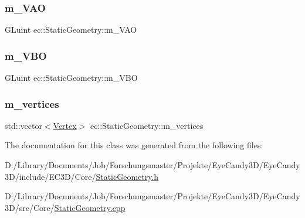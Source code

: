 \mbox{\label{classec_1_1_static_geometry_a7334854b00afa43e3ce02ce2e0600631}} 
\subsubsection{\texorpdfstring{m\+\_\+\+V\+AO}{m\_VAO}}
{\footnotesize\ttfamily G\+Luint ec\+::\+Static\+Geometry\+::m\+\_\+\+V\+AO\hspace{0.3cm}{\ttfamily [protected]}}

\mbox{\label{classec_1_1_static_geometry_a14a581a93ea66ca97c79d554390fbd7b}} 
\subsubsection{\texorpdfstring{m\+\_\+\+V\+BO}{m\_VBO}}
{\footnotesize\ttfamily G\+Luint ec\+::\+Static\+Geometry\+::m\+\_\+\+V\+BO\hspace{0.3cm}{\ttfamily [protected]}}

\mbox{\label{classec_1_1_static_geometry_a7407d00e3c3a4157cc3a3d1ac5000631}} 
\subsubsection{\texorpdfstring{m\+\_\+vertices}{m\_vertices}}
{\footnotesize\ttfamily std\+::vector$<$\mbox{\hyperlink{structec_1_1_vertex}{Vertex}}$>$ ec\+::\+Static\+Geometry\+::m\+\_\+vertices\hspace{0.3cm}{\ttfamily [protected]}}



The documentation for this class was generated from the following files\+:\begin{DoxyCompactItemize}
\item 
D\+:/\+Library/\+Documents/\+Job/\+Forschungsmaster/\+Projekte/\+Eye\+Candy3\+D/\+Eye\+Candy3\+D/include/\+E\+C3\+D/\+Core/\mbox{\hyperlink{_static_geometry_8h}{Static\+Geometry.\+h}}\item 
D\+:/\+Library/\+Documents/\+Job/\+Forschungsmaster/\+Projekte/\+Eye\+Candy3\+D/\+Eye\+Candy3\+D/src/\+Core/\mbox{\hyperlink{_static_geometry_8cpp}{Static\+Geometry.\+cpp}}\end{DoxyCompactItemize}
